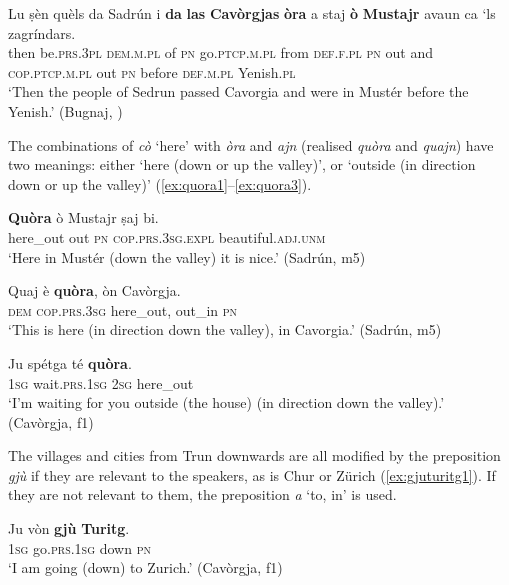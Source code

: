 \ea
\label{ex:omustajr1}
\gll Lu ṣèn quèls da Sadrún i \textbf{da} \textbf{las} \textbf{Cavòrgjas} \textbf{òra} a staj \textbf{ò} \textbf{Mustajr} avaun ca `ls zagríndars.\\
then be.\textsc{prs.3pl} \textsc{dem.m.pl} of \textsc{pn} go.\textsc{ptcp.m.pl} from \textsc{def.f.pl} \textsc{pn} out and \textsc{cop.ptcp.m.pl} out \textsc{pn} before {} \textsc{def.m.pl} Yenish.\textsc{pl}\\
\glt `Then the people of Sedrun passed  Cavorgia and were in Mustér before the Yenish.' (Bugnaj, \citealt[132]{Büchli1966})
\z

The combinations of \textit{cò} `here' with \textit{òra} and \textit{ajn} (realised \textit{quòra} and \textit{quajn}) have two meanings: either `here (down or up the valley)', or `outside (in direction down or up the valley)' (\ref{ex:quora1}--\ref{ex:quora3}).

\ea
\label{ex:quora1}
\gll \textbf{Quòra} ò Mustajr ṣaj bi.\\
here\_out out \textsc{pn} \textsc{cop.prs.3sg.expl} beautiful.\textsc{adj.unm}\\
\glt `Here in Mustér (down the valley) it is nice.' (Sadrún, m5)
\z

\ea
\label{ex:quora2}
\gll Quaj è \textbf{quòra}, òn Cavòrgja.\\
\textsc{dem} \textsc{cop.prs.3sg} here\_out, out\_in \textsc{pn}\\
\glt `This is here (in direction down the valley), in Cavorgia.' (Sadrún, m5)
\z

\ea
\label{ex:quora3}
\gll Ju spétga té \textbf{quòra}.\\
\textsc{1sg} wait.\textsc{prs.1sg} \textsc{2sg} here\_out\\
\glt `I'm waiting for you outside (the house) (in direction down the valley).' (Cavòrgja, f1)
\z

The villages and cities from Trun downwards are all modified by the preposition \textit{gjù} if they are relevant to the speakers, as is Chur or Zürich (\ref{ex:gjuturitg1}). If they are not relevant to them, the preposition \textit{a} `to, in' is used.

\ea
\label{ex:gjuturitg1}
\gll  Ju vòn \textbf{gjù} \textbf{Turitg}\footnotemark.\\
\textsc{1sg} go.\textsc{prs.1sg} down \textsc{pn}\\
\glt `I am going (down) to Zurich.'  (Cavòrgja, f1)
\z

